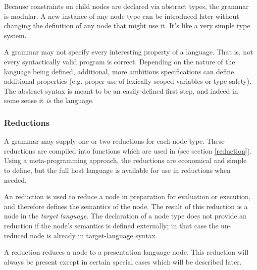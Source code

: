 Because constraints on child nodes are declared via abstract types, the grammar is modular. A new instance of any node type can be introduced later without changing the definition of any node that might use it. It's like a very simple type system. 



A grammar may not specify every interesting property of a language. That is, not every syntactically valid program is correct. Depending on the nature of the language being defined, additional, more ambitious specifications can define additional properties (e.g. proper use of lexically-scoped variables or type safety). The abstract syntax is meant to be an easily-defined first step, and indeed in some sense it \emph{is} the language.

\subsubsection{Reductions}
A grammar may supply one or two reductions for each node type. These reductions are compiled into functions which are used in \todo{} (see section \ref{reduction}). Using a meta-programming approach, the reductions are economical and simple to define, but the full host language is available for use in reductions when needed.

An  reduction is used to reduce a node in preparation for evaluation or execution, and therefore defines the semantics of the node. The result of this reduction is a node in the \emph{target language}. The declaration of a node type does not provide an  reduction if the node's semantics is defined externally; in that case the un-reduced node is already in target-language syntax.

A  reduction reduces a node to a presentation language node. This reduction will always be present except in certain special cases which will be described later.

